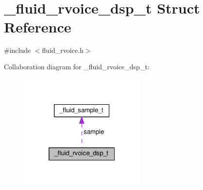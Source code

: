 \hypertarget{struct__fluid__rvoice__dsp__t}{}\section{\+\_\+fluid\+\_\+rvoice\+\_\+dsp\+\_\+t Struct Reference}
\label{struct__fluid__rvoice__dsp__t}


{\ttfamily \#include $<$fluid\+\_\+rvoice.\+h$>$}



Collaboration diagram for \+\_\+fluid\+\_\+rvoice\+\_\+dsp\+\_\+t\+:
\nopagebreak
\begin{figure}[H]
\begin{center}
\leavevmode
\includegraphics[width=181pt]{struct__fluid__rvoice__dsp__t__coll__graph}
\end{center}
\end{figure}
